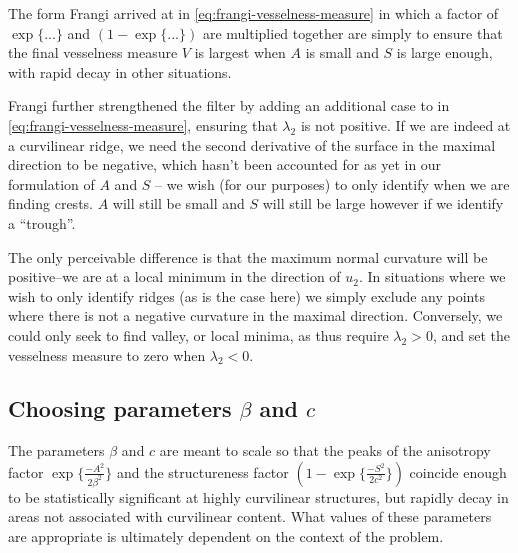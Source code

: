The form Frangi arrived at in \cref{eq:frangi-vesselness-measure} in which a factor of $\exp\{...\}$ and $(1 - \exp\{...\})$ are multiplied together are simply to ensure that the final vesselness measure $V$ is largest when $A$ is small and $S$ is large enough, with rapid decay in other situations.

Frangi further strengthened the filter by adding an additional case to in \cref{eq:frangi-vesselness-measure}, ensuring that $\lambda_2$ is not positive. If we are indeed at a curvilinear ridge, we need the second derivative of the surface in the maximal direction to be negative, which hasn't been accounted for as yet in our formulation of $A$ and $S$ -- we wish (for our purposes) to only identify when we are finding crests. $A$ will still be small and $S$ will still be large however if we identify a ``trough''.

The only perceivable difference is that the maximum normal curvature will be positive--we are at a local minimum in the direction of $u_2$. In situations where we wish to only identify ridges (as is the case here) we simply exclude any points where there is not a negative curvature in the maximal direction. Conversely, we could only seek to find valley, or local minima, as thus require $\lambda_2 > 0$, and set the vesselness measure to zero when $\lambda_2 < 0$.

\subsection{Choosing parameters $\beta$ and $c$}

The parameters $\beta$ and $c$ are meant to scale so that the peaks of the anisotropy factor $\exp\{\frac{-A^2}{2\beta^2}\}$ and the structureness factor $(1-\exp\{\frac{-S^2}{2c^2}\})$ coincide enough to be statistically significant at highly curvilinear structures, but rapidly decay in areas not associated with curvilinear content. What values of these parameters are appropriate is ultimately dependent on the context of the problem.

